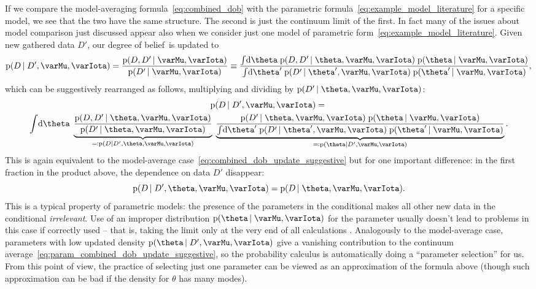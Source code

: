 \documentclass[\ifafour a4paper,12pt,\else a5paper,10pt,\fi%
onecolumn,oneside,article,%
british%
]{memoir}
\theoremstyle{remark}
\theoremstyle{innote}
\newcommand*{\citep}{\parencites}
\newcommand*{\di}{\mathrm{d}}%
\newcommand*{\defs}{\eqqcolon}
\newcommand*{\pf}{\mathrm{p}}%
\renewcommand*{\|}{\nonscript\,\vert\nonscript\;\mathopen{}}
\newcommand*{\chap}{ch.}%
\newcommand*{\dob}{degree of belief}
\newcommand*{\yM}{\varMu}
\newcommand*{\yI}{\varIota}
\newcommand*{\yD}{D}
\newcommand*{\yHm}{\yM}
\begin{document}
If we compare the model-averaging formula~\eqref{eq:combined_dob} with the
parametric formula~\eqref{eq:example_model_literature} for a specific
model, we see that the two have the same structure. The second is just the
continuum limit of the first. In fact many of the issues about model
comparison just discussed appear also when we consider just one model of
parametric form~\eqref{eq:example_model_literature}. Given new gathered
data $\yD'$, our \dob\ is updated to
\begin{equation}
  \label{eq:param_combined_dob_update}
  \pf(\yD \|\yD', \yHm, \yI) =
  \frac{\pf(\yD, \yD'\| \yHm, \yI)}{\pf(\yD' \| \yHm, \yI)} \equiv
  \frac{\int\!\di\theta\; \pf(\yD, \yD' \| \theta, \yHm,\yI)\;
    \pf(\theta \| \yHm, \yI)
  }{
    \int\!\di\theta'\; \pf(\yD' \| \theta',\yHm,\yI)\; \pf(\theta' \|\yHm, \yI)},
\end{equation}
which can be suggestively rearranged as follows, multiplying and
dividing by $\pf(\yD' \|\theta, \yHm, \yI)$:
\begin{multline}
  \label{eq:param_combined_dob_update_suggestive}
  \pf(\yD \|\yD', \yHm, \yI) ={}\\
  \int\!\di\theta\;
  \underbrace{\frac{\pf(\yD, \yD' \|\theta, \yHm,\yI)
    }{
      \pf(\yD' \| \theta, \yHm,\yI)}}_{{}\defs\pf(\yD \| \yD',\theta, \yHm,\yI)}\;
  \underbrace{\frac{
  \pf(\yD' \| \theta, \yHm, \yI)\; \pf(\theta \|\yHm, \yI)
  }{
  \int\!\di\theta'\; \pf(\yD' \| \theta', \yHm, \yI)\; \pf(\theta' \|\yHm, \yI)
  }}_{{}\defs\pf(\theta\|\yD', \yHm, \yI)}.
\end{multline}
This is again equivalent to the model-average
case~\eqref{eq:combined_dob_update_suggestive} but for one important
difference: in the first fraction in the product above, the dependence on
data $\yD'$ disappear:
\begin{equation}
  \label{eq:disappearance_data_given_param}
  \pf(\yD \| \yD',\theta, \yHm,\yI) =
  \pf(\yD \| \theta, \yHm,\yI).
\end{equation}
This is a typical property of parametric models: the presence of the
parameters in the conditional makes all other new data in the conditional
\emph{irrelevant}. Use of an improper distribution
$\pf(\theta \|\yHm, \yI)$ for the parameter usually doesn't lead to
problems in this case if correctly used -- that is, taking the limit only
at the very end of all calculations \citep[\chap~15]{jaynes1994_r2003}.
Analogously to the model-average case, parameters with low updated density
$\pf(\theta \|\yD', \yHm, \yI)$ give a vanishing contribution to the
continuum average~\eqref{eq:param_combined_dob_update_suggestive}, so the
probability calculus is automatically doing a \enquote{parameter selection}
for us. From this point of view, the practice of selecting just one
parameter can be viewed as an approximation of the formula above (though
such approximation can be bad if the density for $\theta$ has many modes).
\end{document}
